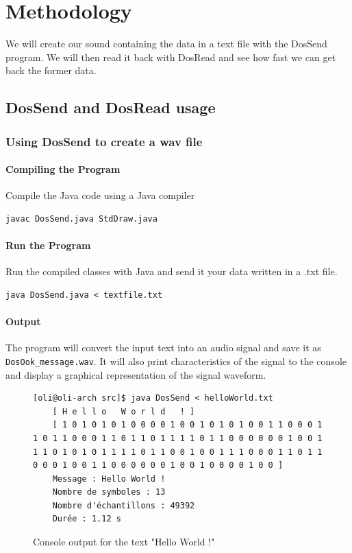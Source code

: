 \chapter{Methodology}

We will create our sound containing the data in a text file with the DosSend program. We will then read it back with DosRead and see how fast we can get back the former data.

\section{DosSend and DosRead usage}

\subsection{Using DosSend to create a wav file}

\subsubsection{Compiling the Program}

Compile the Java code using a Java compiler

\begin{lstlisting}
javac DosSend.java StdDraw.java
\end{lstlisting}

\subsubsection{Run the Program}

Run the compiled classes with Java and send it your data written in a .txt file.

\begin{lstlisting}
java DosSend.java < textfile.txt
\end{lstlisting}

\subsubsection{Output}

The program will convert the input text into an audio signal and save it as \texttt{DosOok\_message.wav}. It will also print characteristics of the signal to the console and display a graphical representation of the signal waveform.

\begin{figure}[!h]
	\begin{lstlisting}[style=console]
	[oli@oli-arch src]$ java DosSend < helloWorld.txt
	[ H e l l o   W o r l d   ! ]
	[ 1 0 1 0 1 0 1 0 0 0 0 1 0 0 1 0 1 0 1 0 0 1 1 0 0 0 1 1 0 1 1 0 0 0 1 1 0 1 1 0 1 1 1 1 0 1 1 0 0 0 0 0 0 1 0 0 1 1 1 0 1 0 1 0 1 1 1 1 0 1 1 0 0 1 0 0 1 1 1 0 0 0 1 1 0 1 1 0 0 0 1 0 0 1 1 0 0 0 0 0 0 1 0 0 1 0 0 0 0 1 0 0 ]
	Message : Hello World !
	Nombre de symboles : 13
	Nombre d'échantillons : 49392
	Durée : 1.12 s
	\end{lstlisting}
	\caption{Console output for the text "Hello World !"}
\end{figure}


